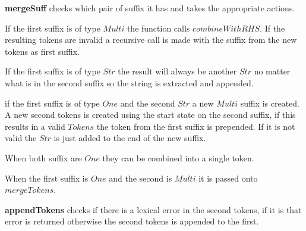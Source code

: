 \textbf{mergeSuff} checks which pair of suffix it has and takes the appropriate
actions.

If the first suffix is of type $Multi$ the function calls $combineWithRHS$. If
the resulting tokens are invalid a recursive call is made with the suffix from
the new tokens as first suffix.

If the first suffix is of type $Str$ the result will always be another $Str$ no
matter what is in the second suffix so the string is extracted and appended.

if the first suffix is of type $One$ and the second $Str$ a new $Multi$ suffix
is created. A new second tokens is created using the start state on the second
suffix, if this results in a valid $Tokens$ the token from the first suffix is
prepended. If it is not valid the $Str$ is just added to the end of the new
suffix.

When both suffix are $One$ they can be combined into a single token.

When the first suffix is $One$ and the second is $Multi$ it is passed onto
$mergeTokens$.

\textbf{appendTokens} checks if there is a lexical error in the second tokens,
if it is that error is returned otherwise the second tokens is appended to the
first.

